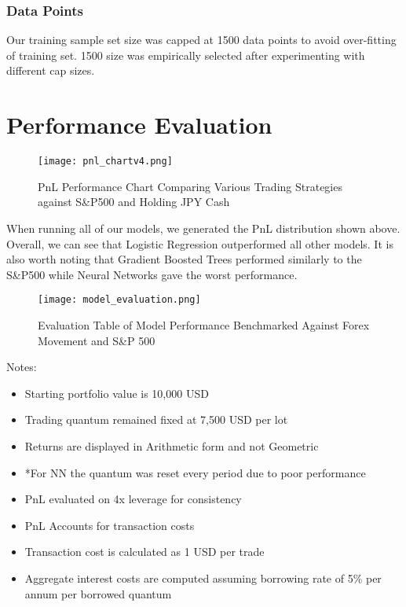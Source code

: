 \documentclass{article}
\begin{document}
\subsubsection{Data Points}
Our training sample set size was capped at 1500 data points to avoid over-fitting of training set. 1500 size was empirically selected after experimenting with different cap sizes.


\section{Performance Evaluation}

\begin{figure}[H]
  \centering
  \texttt{[image: pnl\_chartv4.png]}
  \caption{PnL Performance Chart Comparing Various Trading Strategies against S\&P500 and Holding JPY Cash}
\end{figure}

\noindent When running all of our models, we generated the PnL distribution shown above. Overall, we can see that Logistic Regression outperformed all other models. It is also worth noting that Gradient Boosted Trees performed similarly to the S\&P500 while Neural Networks gave the worst performance.

\begin{figure}[H]
  \centering
  \texttt{[image: model\_evaluation.png]}
  \caption{Evaluation Table of Model Performance Benchmarked Against Forex Movement and S\&P 500}
  \label{fig:chad_salary}
\end{figure}

Notes:
\begin{itemize}
\item Starting portfolio value is 10,000 USD
\item Trading quantum remained fixed at 7,500 USD per lot
\item Returns are displayed in Arithmetic form and not Geometric
\item *For NN the quantum was reset every period due to poor performance
\item PnL evaluated on 4x leverage for consistency
\item PnL Accounts for transaction costs
\item Transaction cost is calculated as 1 USD per trade
\item Aggregate interest costs are computed assuming borrowing rate of 5\% per annum per borrowed quantum
\end{itemize}
\end{document}

